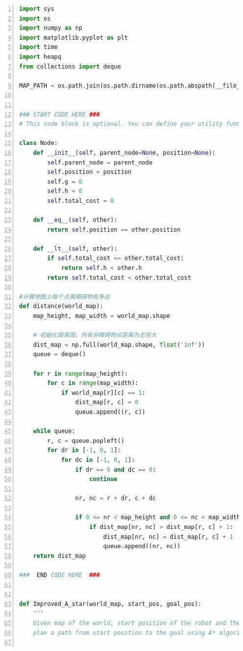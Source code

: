 \documentclass[aps,letterpaper,10pt]{revtex4}
\begin{document}
\begin{lstlisting}[language=Python, caption={Source Code for Task 1 (5-Task\_1.py)}, label={lst:task1_code}, basicstyle=\ttfamily\small, numbers=left, frame=tb, breaklines=true]
import sys
import os
import numpy as np
import matplotlib.pyplot as plt
import time
import heapq
from collections import deque 

MAP_PATH = os.path.join(os.path.dirname(os.path.abspath(__file__)), '3-map/map.npy')


### START CODE HERE ###
# This code block is optional. You can define your utility function and class in this block if necessary.

class Node:
    def __init__(self, parent_node=None, position=None):
        self.parent_node = parent_node
        self.position = position
        self.g = 0  
        self.h = 0     
        self.total_cost = 0       

    def __eq__(self, other):
        return self.position == other.position
    
    def __lt__(self, other):
        if self.total_cost == other.total_cost:
            return self.h < other.h
        return self.total_cost < other.total_cost

#计算地图上每个点离障碍物有多远
def distance(world_map):
    map_height, map_width = world_map.shape

    # 初始化距离图，所有非障碍物点距离为无穷大
    dist_map = np.full(world_map.shape, float('inf'))
    queue = deque()

    for r in range(map_height):
        for c in range(map_width):
            if world_map[r][c] == 1:
                dist_map[r, c] = 0
                queue.append((r, c))

    while queue:
        r, c = queue.popleft()
        for dr in [-1, 0, 1]:
            for dc in [-1, 0, 1]:
                if dr == 0 and dc == 0:
                    continue
                
                nr, nc = r + dr, c + dc

                if 0 <= nr < map_height and 0 <= nc < map_width:
                    if dist_map[nr, nc] > dist_map[r, c] + 1:
                        dist_map[nr, nc] = dist_map[r, c] + 1
                        queue.append((nr, nc))
    return dist_map

###  END CODE HERE  ###


def Improved_A_star(world_map, start_pos, goal_pos):
    """
    Given map of the world, start position of the robot and the position of the goal, 
    plan a path from start position to the goal using A* algorithm.


\end{lstlisting}
\end{document}
